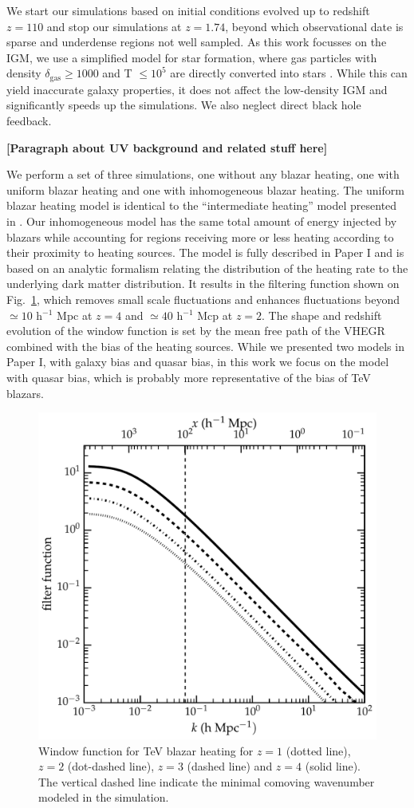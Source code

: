 \documentclass[numberedappendix]{emulateapj}
\newcommand\ALc[1]{{\color{red} \bf #1}} %
\begin{document}
We start our simulations based on initial conditions evolved up to redshift $z=110$ and stop our simulations at $z=1.74$, beyond which observational date is sparse and underdense regions not well sampled. As this work focusses on the IGM, we use a simplified model for star formation, where gas particles with  density $\delta_{\mathrm{gas}}\geq 1000$ and T $\leq 10^5$ are directly converted into stars \citep{2004MNRAS.354..684V}. While this can yield inaccurate galaxy properties, it does not affect the low-density IGM and significantly speeds up the simulations. We also neglect direct black hole feedback.


\ALc{[Paragraph about UV  background and related stuff here]}

We perform a set of three simulations, one without any blazar heating, one with uniform blazar heating and one with inhomogeneous blazar heating.  The uniform blazar heating model is identical to the ``intermediate heating'' model presented in \citet{2012MNRAS.423..149P}.  Our inhomogeneous model has the same total amount of energy injected by blazars while accounting for regions receiving more or less heating according to their proximity to heating sources. The model is fully described in Paper I  and is based on an analytic formalism relating the distribution of the heating rate to the underlying dark matter distribution. It results in the  filtering function shown on Fig.~\ref{fig:window}, which  removes small scale fluctuations and enhances fluctuations beyond $\simeq 10$ h$^{-1}$ Mpc at $z=4$ and $\simeq 40$ h$^{-1}$ Mcp at $z=2$.  The shape and redshift evolution of the  window function is set by the mean free path of the VHEGR combined with the bias of the heating sources.  While we presented two models in Paper I, with galaxy bias and quasar bias, in this work we focus on the model with quasar bias, which is probably more representative of the bias of TeV blazars.  

\begin{figure}[h]
\centering
 \includegraphics[width = .45\textwidth ]{window_qso}
\caption{Window function for TeV blazar heating for $z=1$ (dotted line), $z=2$ (dot-dashed line), $z=3$ (dashed line)  and $z=4$ (solid line).  The vertical dashed line indicate the minimal comoving wavenumber modeled in the simulation.}
\label{fig:window}
\end{figure}
\end{document}
